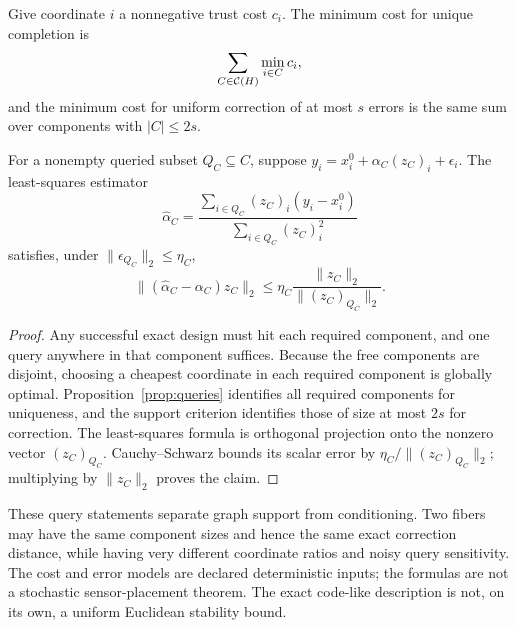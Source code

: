\begin{proposition}\label{prop:query-cost}
Give coordinate $i$ a nonnegative trust cost $c_i$. The minimum cost for unique completion is
\[
 \sum_{C\in\mathcal C(H)}\min_{i\in C}c_i,
\]
and the minimum cost for uniform correction of at most $s$ errors is the same sum over components with $|C|\le2s$.

For a nonempty queried subset $Q_C\subseteq C$, suppose
$y_i=x_i^0+\alpha_C(z_C)_i+\epsilon_i$. The least-squares estimator
\[
 \widehat\alpha_C=
 \frac{\sum_{i\in Q_C}(z_C)_i(y_i-x_i^0)}
      {\sum_{i\in Q_C}(z_C)_i^2}
\]
satisfies, under $\|\epsilon_{Q_C}\|_2\le\eta_C$,
\[
 \|(\widehat\alpha_C-\alpha_C)z_C\|_2
 \le \eta_C\frac{\|z_C\|_2}{\|(z_C)_{Q_C}\|_2}.
\]
\end{proposition}
\begin{proof}
Any successful exact design must hit each required component, and one query anywhere in that component suffices. Because the free components are disjoint, choosing a cheapest coordinate in each required component is globally optimal. Proposition~\ref{prop:queries} identifies all required components for uniqueness, and the support criterion identifies those of size at most $2s$ for correction. The least-squares formula is orthogonal projection onto the nonzero vector $(z_C)_{Q_C}$. Cauchy--Schwarz bounds its scalar error by $\eta_C/\|(z_C)_{Q_C}\|_2$; multiplying by $\|z_C\|_2$ proves the claim.
\end{proof}

These query statements separate graph support from conditioning. Two fibers may have the same component sizes and hence the same exact correction distance, while having very different coordinate ratios and noisy query sensitivity. The cost and error models are declared deterministic inputs; the formulas are not a stochastic sensor-placement theorem. The exact code-like description is not, on its own, a uniform Euclidean stability bound.

